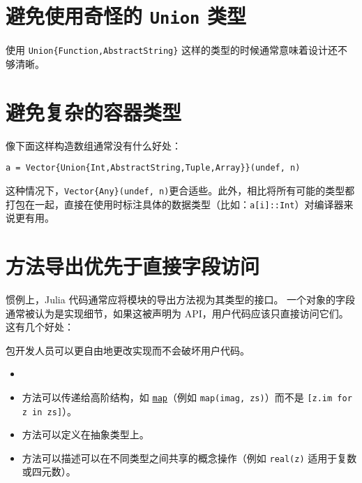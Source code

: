\hypertarget{14194687290331521644}{}


\section{避免使用奇怪的 \texttt{Union} 类型}



使用 \texttt{Union\{Function,AbstractString\}} 这样的类型的时候通常意味着设计还不够清晰。



\hypertarget{6548025962580232135}{}


\section{避免复杂的容器类型}



像下面这样构造数组通常没有什么好处：




\begin{verbatim}
a = Vector{Union{Int,AbstractString,Tuple,Array}}(undef, n)
\end{verbatim}



这种情况下，\texttt{Vector\{Any\}(undef, n)}更合适些。此外，相比将所有可能的类型都打包在一起，直接在使用时标注具体的数据类型（比如：\texttt{a[i]::Int}）对编译器来说更有用。



\hypertarget{2535775561601867117}{}


\section{方法导出优先于直接字段访问}



惯例上，Julia 代码通常应将模块的导出方法视为其类型的接口。 一个对象的字段通常被认为是实现细节，如果这被声明为 API，用户代码应该只直接访问它们。 这有几个好处：



包开发人员可以更自由地更改实现而不会破坏用户代码。



\begin{itemize}
\item
\item 方法可以传递给高阶结构，如 \hyperlink{11483231213869150535}{\texttt{map}}（例如 \texttt{map(imag, zs)}）而不是 \texttt{[z.im for z in zs]}）。


\item 方法可以定义在抽象类型上。


\item 方法可以描述可以在不同类型之间共享的概念操作（例如 \texttt{real(z)} 适用于复数或四元数）。

\end{itemize}


